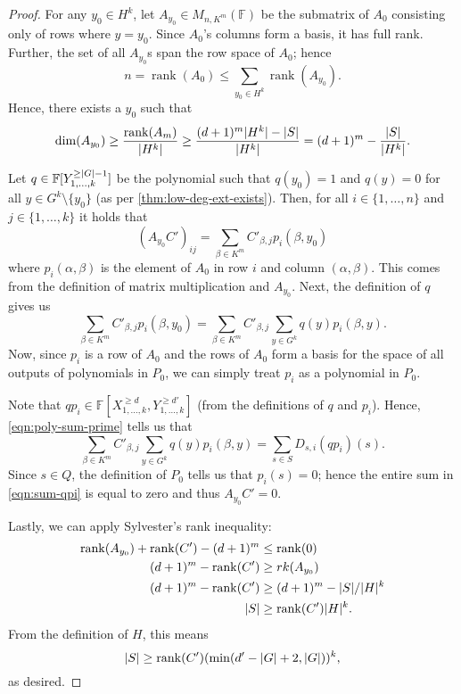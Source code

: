 \documentclass[english,12pt]{reedthesis}
\theoremstyle{plain}
\theoremstyle{definition}
\theoremstyle{remark}
\DeclareMathOperator{\rk}{rank}
\DeclarePairedDelimiter{\abs}{\lvert}{\rvert}
\begin{document}
\begin{proof}
  For any $y_{0} \in H^{k}$, let $A_{y_{0}} \in M_{n,K^{m}}(\mathbb{F})$ be the
  submatrix of $A_{0}$ consisting only of rows where $y = y_{0}$.
  Since $A_{0}$'s columns form a basis, it has full rank. Further, the set of
  all $A_{y_{0}}$s span the row space of $A_{0}$; hence
  \[
    n = \rk(A_{0}) \le \sum_{y_{0} \in H^{k}}\rk(A_{y_{0}}).
  \]
  Hence, there exists a $y_{0}$ such that
  \[
    \dim(A_{y_{0}}) \ge \frac{\rk(A_{m})}{\abs{H^{k}}}
    \ge \frac{(d+1)^{m}\abs{H^{k}} - \abs{S}}{\abs{H^{k}}} = (d+1)^{m} - \frac{\abs{S}}{\abs{H^{k}}}.
  \]

  Let $q \in \mathbb{F}[Y_{1, \ldots, k}^{\ge \abs{G} - 1}]$ be the polynomial such that
  $q(y_{0}) = 1$ and $q(y) = 0$ for all $y \in G^{k} \setminus \{y_{0}\}$ (as per
  \cref{thm:low-deg-ext-exists}). Then, for all $i \in \{1, \ldots, n\}$ and
  $j \in \{1, \ldots, k\}$ it holds that
  \begin{equation}
    (A_{y_{0}}C')_{ij} = \sum_{\beta \in K^{m}}C'_{\beta,j}p_{i}(\beta, y_{0})
  \end{equation}
  where $p_{i}(\alpha, \beta)$ is the element of $A_{0}$ in row $i$ and column $(\alpha,\beta)$.
  This comes from the definition of matrix multiplication and $A_{y_{0}}$. Next,
  the definition of $q$ gives us
  \begin{equation}
    \sum_{\beta \in K^{m}}C'_{\beta,j}p_{i}(\beta, y_{0}) = \sum_{\beta \in K^{m}}C'_{\beta,j}\sum_{y \in G^{k}}q(y)p_{i}(\beta,y).
  \end{equation}
  Now, since $p_{i}$ is a row of $A_{0}$ and the rows of $A_{0}$ form a basis
  for the space of all outputs of polynomials in $P_{0}$, we can simply treat
  $p_{i}$ as a polynomial in $P_{0}$.

  Note that $qp_{i} \in \mathbb{F}[X_{1, \ldots, k}^{\ge d}, Y_{1, \ldots, k}^{\ge d'}]$ (from
  the definitions of $q$ and $p_{i}$). Hence, \cref{eqn:poly-sum-prime} tells us
  that
  \begin{equation}\label{eqn:sum-qpi}
    \sum_{\beta \in K^{m}}C'_{\beta,j}\sum_{y \in G^{k}}q(y)p_{i}(\beta,y) = \sum_{s \in S}D_{s,i}(qp_{i})(s).
  \end{equation}
  Since $s \in Q$, the definition of $P_{0}$ tells us that $p_{i}(s) = 0$; hence
  the entire sum in \cref{eqn:sum-qpi} is equal to zero and thus
  $A_{y_{0}}C' = 0$.

  Lastly, we can apply Sylvester's rank inequality:
  \begin{align*}
    \rk(A_{y_{0}}) + \rk(C') - (d+1)^{m} &\le \rk(0) \\
    (d+1)^{m} - \rk(C') &\ge rk(A_{y_{0}}) \\
    (d+1)^{m} - \rk(C') &\ge (d+1)^{m} - \abs{S}/\abs{H}^{k} \\
    \abs{S} &\ge \rk(C')\abs{H}^{k}.
  \end{align*}
  From the definition of $H$, this means
  \[
    \abs{S} \ge \rk(C')(\min(d' - \abs{G} + 2, \abs{G}))^{k},
  \]
  as desired.
\end{proof}
\end{document}
